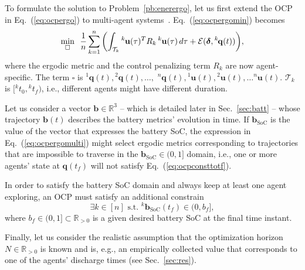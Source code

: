 \documentclass[letterpaper,10pt,conference,twoside]{IEEEtran}
\theoremstyle{definition}
\begin{document}
To formulate the solution to Problem~\ref{pb:enerergo}, let us first extend the OCP in Eq.~(\ref{eq:ocpergo}) to multi-agent systems~\cite{coffin2022multi}. Eq.~(\ref{eq:ocpergomin}) becomes
\begin{equation}\label{eq:ocpergomulti}
  \min_{\square}\,\,\,{\frac{1}{n}\sum_{k=1}^{n}\left(\int_{\mathcal{T}_k}{}^k\hspace*{-.1ex}\mathbf{u}(\tau)^TR_k\,{}^k\hspace*{-.1ex}\mathbf{u}(\tau)\,d\tau+\mathcal{E}(\boldsymbol{\delta},{}^k\hspace*{-.2ex}\mathbf{q}(t))\right)},
\end{equation}
where the ergodic metric and the control penalizing term $R_k$ are now agent-specific. The term $\square$ is ${}^1\mathbf{q}(t),{}^2\mathbf{q}(t),\dots,$ ${}^n\mathbf{q}(t),{}^1\mathbf{u}(t),{}^2\mathbf{u}(t),\dots{}^n\mathbf{u}(t)$. $\mathcal{T}_k$ is $[{}^kt_0, {}^kt_f)$, i.e., different agents might have different duration.

Let us consider a vector $\mathbf{b}\in\mathbb{R}^3$ -- which is detailed later in Sec.~\ref{sec:batt} -- whose trajectory $\mathbf{b}(t)$ describes the battery metrics' evolution in time. If $\mathbf{b}_{\text{SoC}}$ is the value of the vector that expresses the battery %
SoC, the expression in Eq.~(\ref{eq:ocpergomulti}) might select ergodic metrics corresponding to trajectories that are impossible to traverse in the $\mathbf{b}_{\text{SoC}}\in(0,1]$ domain, i.e., one or more agents' state at $\mathbf{q}(t_f)$ will not satisfy Eq.~(\ref{eq:ocpconsttotf}).

In order to satisfy the battery SoC domain and always keep at least one agent exploring, an OCP must satisfy an additional constrain
\begin{equation}\label{eq:ocpbattconst}
  \exists k\in[n]\text{ s.t. }{}^k\mathbf{b}_{\text{SoC}}(t_f)\in(0,b_f],
\end{equation}
where $b_f\in(0,1]\subset\mathbb{R}_{>0}$ is a given desired battery SoC at the final time instant.

Finally, let us consider the realistic assumption that the optimization horizon $N\in\mathbb{R}_{>0}$ is known and is,
e.g., an empirically collected value that corresponds to one of the agents' discharge times (see Sec.~\ref{sec:res}).
\end{document}
